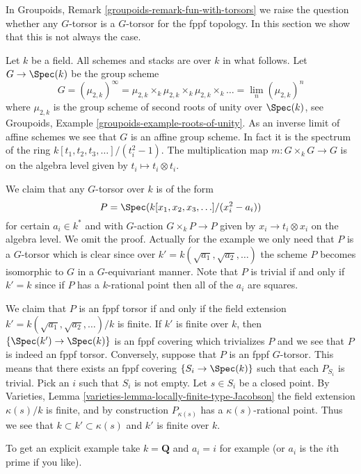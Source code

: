 \noindent
In
Groupoids, Remark \ref{groupoids-remark-fun-with-torsors}
we raise the question whether any $G$-torsor is a $G$-torsor for the
fppf topology. In this section we show that this is not always the case.

\medskip\noindent
Let $k$ be a field. All schemes and stacks are over $k$ in what follows.
Let $G \to \Spec(k)$ be the group scheme
$$
G = (\mu_{2, k})^\infty =
\mu_{2, k} \times_k \mu_{2, k} \times_k \mu_{2, k} \times_k \ldots =
\lim_n (\mu_{2, k})^n
$$
where $\mu_{2, k}$ is the group scheme of second roots of unity over
$\Spec(k)$, see
Groupoids, Example \ref{groupoids-example-roots-of-unity}.
As an inverse limit of affine schemes we see that $G$ is an affine group
scheme. In fact it is the spectrum of the ring
$k[t_1, t_2, t_3, \ldots]/(t_i^2 - 1)$. The multiplication map
$m : G \times_k G \to G$ is on the algebra level given by
$t_i \mapsto t_i \otimes t_i$.

\medskip\noindent
We claim that any $G$-torsor over $k$ is of the form
$$
P = \Spec(k[x_1, x_2, x_3, \ldots]/(x_i^2 - a_i))
$$
for certain $a_i \in k^*$ and with $G$-action $G \times_k P \to P$
given by $x_i \to t_i \otimes x_i$ on the algebra level.
We omit the proof.
Actually for the example we only need that $P$ is a $G$-torsor
which is clear since over $k' = k(\sqrt{a_1}, \sqrt{a_2}, \ldots)$
the scheme $P$ becomes isomorphic to $G$ in a $G$-equivariant manner.
Note that $P$ is trivial if and only if $k' = k$ since if
$P$ has a $k$-rational point then all of the $a_i$ are squares.

\medskip\noindent
We claim that $P$ is an fppf torsor if and only if the field extension
$k' = k(\sqrt{a_1}, \sqrt{a_2}, \ldots)/k$ is finite.
If $k'$ is finite over $k$, then
$\{\Spec(k') \to \Spec(k)\}$
is an fppf covering which trivializes $P$ and we see that $P$ is indeed
an fppf torsor. Conversely, suppose that $P$ is an fppf $G$-torsor.
This means that there exists an fppf covering
$\{S_i \to \Spec(k)\}$ such that each $P_{S_i}$ is trivial.
Pick an $i$ such that $S_i$ is not empty. Let $s \in S_i$ be a closed
point. By
Varieties, Lemma \ref{varieties-lemma-locally-finite-type-Jacobson}
the field extension $\kappa(s)/k$ is finite, and by construction
$P_{\kappa(s)}$ has a $\kappa(s)$-rational point. Thus we see that
$k \subset k' \subset \kappa(s)$ and $k'$ is finite over $k$.

\medskip\noindent
To get an explicit example take $k = \mathbf{Q}$ and $a_i = i$
for example (or $a_i$ is the $i$th prime if you like).

